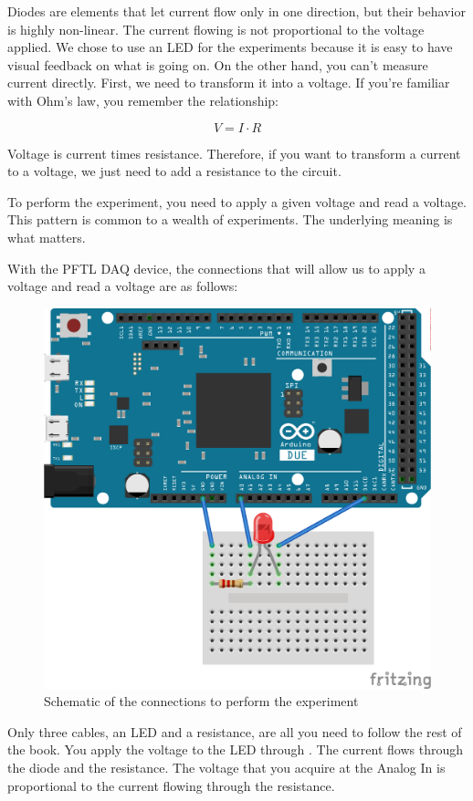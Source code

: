 Diodes are elements that let current flow only in one direction, but their behavior is highly non-linear. The current flowing is not proportional to the voltage applied. We chose to use an LED for the experiments because it is easy to have visual feedback on what is going on. On the other hand, you can't measure current directly. First, we need to transform it into a voltage. If you're familiar with Ohm's law, you remember the relationship:

\begin{equation}
V = I \cdot R
\end{equation}

Voltage is current times resistance. Therefore, if you want to transform a current to a voltage, we just need to add a resistance to the circuit.

To perform the experiment, you need to apply a given voltage and read a  voltage. This pattern is common to a wealth of experiments. The underlying meaning is what matters.

With the {PFTL DAQ} device, the connections that will allow us to apply a voltage and read a voltage are as follows:

\begin{figure}
\centering
\includegraphics[width=.5\textwidth]{images/Chapter_03/IV_scheme_bb.png}
\caption{Schematic of the connections to perform the experiment}
\end{figure}

Only three cables, an LED and a resistance, are all you need to follow the rest of the book. You apply the voltage to the LED through . The current flows through the diode and the resistance. The voltage that you acquire at the Analog In  is proportional to the current flowing through the resistance.


